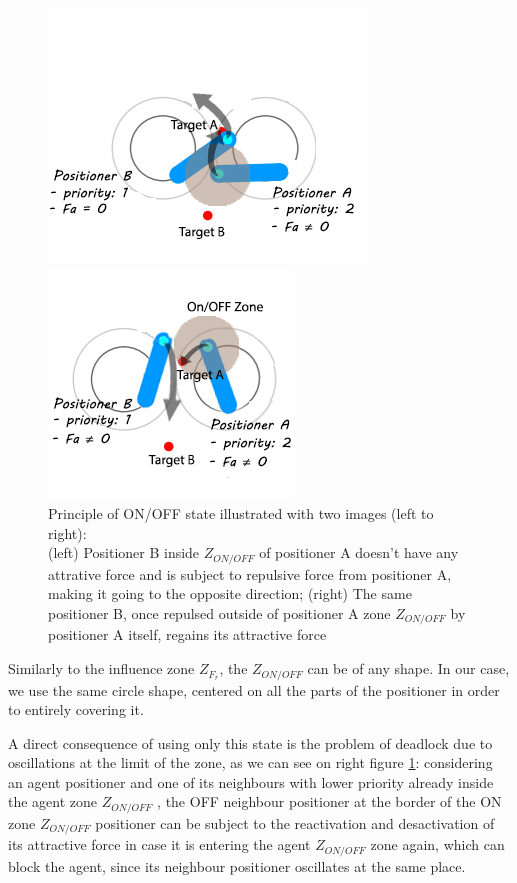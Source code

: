 \documentclass[]{spie}  %
\begin{document}
	\begin{figure}[H]
		\centering
		\begin{minipage}[t]{6.5cm}
			\includegraphics[scale=0.54]{images/first_state_0.jpg}
		\end{minipage}
		\begin{minipage}[t]{5cm}
			\includegraphics[scale=0.54]{images/first_state_ONOFF2.jpg}
		\end{minipage}
		\caption{\centering Principle of ON/OFF state illustrated with two images (left to right): \\
			(left) Positioner B inside  $Z_{ON/OFF}$ of positioner A doesn't have any attrative force and is subject to repulsive force from positioner A, making it going to the opposite direction; (right) The same positioner B, once repulsed outside of positioner A zone $Z_{ON/OFF}$  by positioner A itself, regains its attractive force\\
\label{key}			}
		\label{First_state}
	\end{figure}
	Similarly to the influence zone $Z_{F_{r}}$, the $Z_{ON/OFF}$ can be of any shape. In our case, we use the same circle shape, centered on all the parts of the positioner in order to entirely covering it.
	
	A direct consequence of using only this state is the problem of deadlock due to oscillations at the limit of the zone, as we can see on right figure \ref{First_state}: considering an agent positioner and one of its neighbours with lower priority already inside the agent zone $Z_{ON/OFF}$ , the OFF neighbour positioner at the border of the ON zone $Z_{ON/OFF}$ positioner can be subject to the reactivation and desactivation of its attractive force in case it is entering the agent $Z_{ON/OFF}$ zone again, which can block the agent, since its neighbour positioner oscillates at the same place.\\
	
\end{document}
